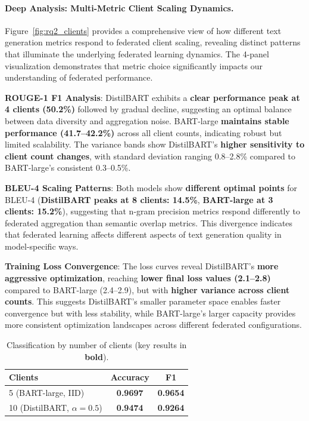 \documentclass[conference]{IEEEtran}
\begin{document}
\paragraph{Deep Analysis: Multi-Metric Client Scaling Dynamics.} Figure~\ref{fig:rq2_clients} provides a comprehensive view of how different text generation metrics respond to federated client scaling, revealing distinct patterns that illuminate the underlying federated learning dynamics. The 4-panel visualization demonstrates that metric choice significantly impacts our understanding of federated performance.

\textbf{ROUGE-1 F1 Analysis}: DistilBART exhibits a \textbf{clear performance peak at 4 clients (50.2\%)} followed by gradual decline, suggesting an optimal balance between data diversity and aggregation noise. BART-large \textbf{maintains stable performance (41.7--42.2\%)} across all client counts, indicating robust but limited scalability. The variance bands show DistilBART's \textbf{higher sensitivity to client count changes}, with standard deviation ranging 0.8--2.8\% compared to BART-large's consistent 0.3--0.5\%.

\textbf{BLEU-4 Scaling Patterns}: Both models show \textbf{different optimal points} for BLEU-4 (\textbf{DistilBART peaks at 8 clients: 14.5\%}, \textbf{BART-large at 3 clients: 15.2\%}), suggesting that n-gram precision metrics respond differently to federated aggregation than semantic overlap metrics. This divergence indicates that federated learning affects different aspects of text generation quality in model-specific ways.

\textbf{Training Loss Convergence}: The loss curves reveal DistilBART's \textbf{more aggressive optimization}, reaching \textbf{lower final loss values (2.1--2.8)} compared to BART-large (2.4--2.9), but with \textbf{higher variance across client counts}. This suggests DistilBART's smaller parameter space enables faster convergence but with less stability, while BART-large's larger capacity provides more consistent optimization landscapes across different federated configurations.

\begin{table}[H]
    \centering
    \caption{Classification by number of clients (key results in \textbf{bold}).}
    \label{tab:cls_by_clients}
    \begin{tabular}{lcc}
        \hline
        Clients & Accuracy & F1 \\
        \hline
        5 (BART-large, IID) & \textbf{0.9697} & \textbf{0.9654} \\
        10 (DistilBART, $\alpha{=}0.5$) & \textbf{0.9474} & \textbf{0.9264} \\
        \hline
    \end{tabular}
\end{table}
\end{document}
